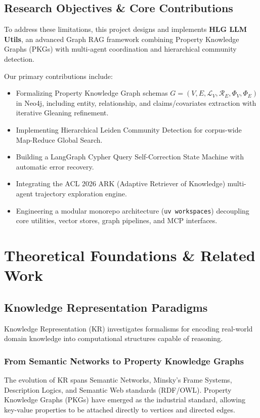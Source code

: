 \documentclass[11pt,a4paper]{report}
\begin{document}
\section{Research Objectives \& Core Contributions}
To address these limitations, this project designs and implements \textbf{HLG LLM Utils}, an advanced Graph RAG framework combining Property Knowledge Graphs (PKGs) with multi-agent coordination and hierarchical community detection.

Our primary contributions include:
\begin{itemize}
    \item Formalizing Property Knowledge Graph schemas $G = (V, E, \mathcal{L}_V, \mathcal{R}_E, \Phi_V, \Phi_E)$ in Neo4j, including entity, relationship, and claims/covariates extraction with iterative Gleaning refinement.
    \item Implementing Hierarchical Leiden Community Detection for corpus-wide Map-Reduce Global Search.
    \item Building a LangGraph Cypher Query Self-Correction State Machine with automatic error recovery.
    \item Integrating the ACL 2026 ARK (Adaptive Retriever of Knowledge) multi-agent trajectory exploration engine.
    \item Engineering a modular monorepo architecture (\texttt{uv workspaces}) decoupling core utilities, vector stores, graph pipelines, and MCP interfaces.
\end{itemize}

\chapter{Theoretical Foundations \& Related Work}

\section{Knowledge Representation Paradigms}
Knowledge Representation (KR) investigates formalisms for encoding real-world domain knowledge into computational structures capable of reasoning.

\subsection{From Semantic Networks to Property Knowledge Graphs}
The evolution of KR spans Semantic Networks, Minsky's Frame Systems, Description Logics, and Semantic Web standards (RDF/OWL). Property Knowledge Graphs (PKGs) have emerged as the industrial standard, allowing key-value properties to be attached directly to vertices and directed edges.
\end{document}
